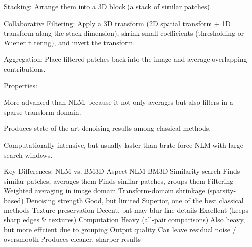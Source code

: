 Stacking: Arrange them into a 3D block (a stack of similar patches).

Collaborative Filtering: Apply a 3D transform (2D spatial transform + 1D transform along the stack dimension), shrink small coefficients (thresholding or Wiener filtering), and invert the transform.

Aggregation: Place filtered patches back into the image and average overlapping contributions.

Properties:

More advanced than NLM, because it not only averages but also filters in a sparse transform domain.

Produces state-of-the-art denoising results among classical methods.

Computationally intensive, but usually faster than brute-force NLM with large search windows.

Key Differences: NLM vs. BM3D
Aspect	NLM	BM3D
Similarity search	Finds similar patches, averages them	Finds similar patches, groups them
Filtering	Weighted averaging in image domain	Transform-domain shrinkage (sparsity-based)
Denoising strength	Good, but limited	Superior, one of the best classical methods
Texture preservation	Decent, but may blur fine details	Excellent (keeps sharp edges & textures)
Computation	Heavy (all-pair comparisons)	Also heavy, but more efficient due to grouping
Output quality	Can leave residual noise / oversmooth	Produces cleaner, sharper results
